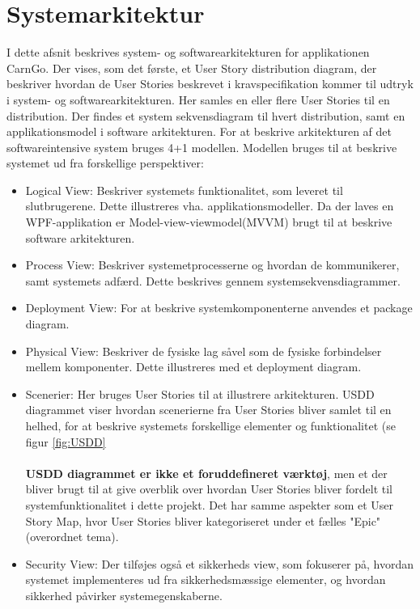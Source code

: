 \documentclass[a4paper,12pt,fleqn,oneside]{article}
\begin{document}
\label{architecture}


 \newpage
\tableofcontents
\newpage
\section{Systemarkitektur}
I dette afsnit beskrives system- og softwarearkitekturen for applikationen CarnGo. Der vises, som det første, et User Story distribution diagram, der beskriver hvordan de User Stories beskrevet i kravspecifikation kommer til udtryk i system- og softwarearkitekturen. Her samles en eller flere User Stories til en distribution. Der findes et system sekvensdiagram til hvert distribution, samt en applikationsmodel i software arkitekturen. For at beskrive arkitekturen af det softwareintensive system bruges 4+1 modellen. Modellen bruges til at beskrive systemet ud fra forskellige perspektiver:
\begin{itemize}
    \item Logical View: Beskriver systemets funktionalitet, som leveret til slutbrugerene. Dette illustreres vha. applikationsmodeller. Da der laves en WPF-applikation er Model-view-viewmodel(MVVM) brugt til at beskrive software arkitekturen. 
    \item Process View: Beskriver systemetprocesserne og hvordan de kommunikerer, samt systemets adfærd. Dette beskrives gennem systemsekvensdiagrammer. 
    \item Deployment View: For at beskrive systemkomponenterne anvendes et package diagram. 
    \item Physical View: Beskriver de fysiske lag såvel som de fysiske forbindelser mellem komponenter. Dette illustreres med et deployment diagram. 
    \item Scenerier: Her bruges User Stories til at illustrere arkitekturen. USDD diagrammet viser hvordan scenerierne fra User Stories bliver samlet til en helhed, for at beskrive systemets forskellige elementer og funktionalitet (se figur \ref{fig:USDD} \\\\
    \textbf{USDD diagrammet er ikke et foruddefineret værktøj}, men et der bliver brugt til at give overblik over hvordan User Stories bliver fordelt til systemfunktionalitet i dette projekt. Det har samme aspekter som et User Story Map, hvor User Stories bliver kategoriseret under et fælles "Epic" (overordnet tema).
    \item Security View: Der tilføjes også et sikkerheds view, som fokuserer på, hvordan systemet implementeres ud fra sikkerhedsmæssige elementer, og hvordan sikkerhed påvirker systemegenskaberne. 
\end{itemize} \newpage 
\end{document}

